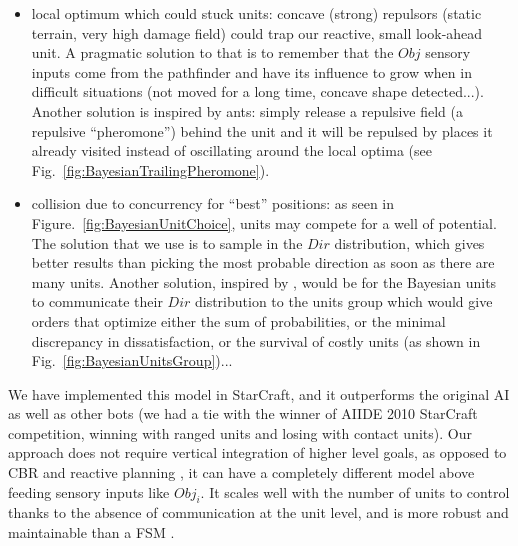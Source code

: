 \begin{itemize}
    \item local optimum which could stuck units: concave (strong) repulsors (static terrain, very high damage field) could trap our reactive, small look-ahead unit. A pragmatic solution to that is to remember that the $Obj$ sensory inputs come from the pathfinder and have its influence to grow when in difficult situations (not moved for a long time, concave shape detected...). Another solution is inspired by ants: simply release a repulsive field (a repulsive ``pheromone'') behind the unit and it will be repulsed by places it already visited instead of oscillating around the local optima (see Fig.~\ref{fig:BayesianTrailingPheromone}).
    \item collision due to concurrency for ``best'' positions: as seen in Figure.~\ref{fig:BayesianUnitChoice}, units may compete for a well of potential. The solution that we use is to sample in the $Dir$ distribution, which gives better results than picking the most probable direction as soon as there are many units. Another solution, inspired by \citep{Marthi05concurrenthierarchical}, would be for the Bayesian units to communicate their $Dir$ distribution to the units group which would give orders that optimize either the sum of probabilities, or the minimal discrepancy in dissatisfaction, or the survival of costly units (as shown in Fig.~\ref{fig:BayesianUnitsGroup})...
\end{itemize}


We have implemented this model in StarCraft, and it outperforms the original AI as well as other bots (we had a tie with the winner of AIIDE 2010 StarCraft competition, winning with ranged units and losing with contact units). Our approach does not require vertical integration of higher level goals, as opposed to CBR and reactive planning \citep{Ontanon2007,WeberCIG10}, it can have a completely different model above feeding sensory inputs like $Obj_i$. It scales well with the number of units to control thanks to the absence of communication at the unit level, and is more robust and maintainable than a FSM \citep{FSM}.

